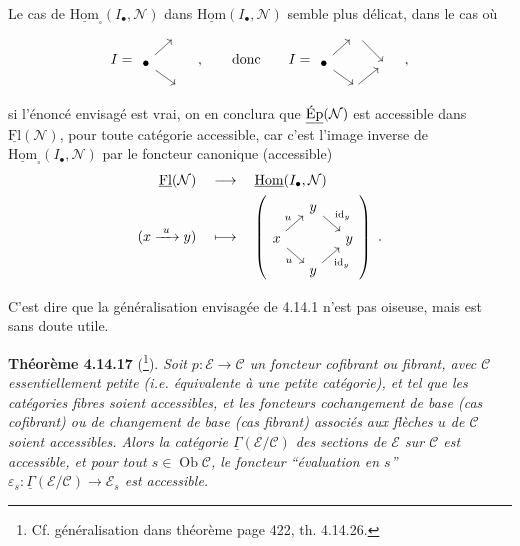 \documentclass[11pt]{article}
\newcommand{\printedpage}[1]{\marginpar{\footnotesize p.~#1}}
\newcommand{\msp}[1]{\marginpar{\footnotesize [#1]}}
\newcommand{\uHom}{\underline{\mathrm{Hom}}}
\newcommand{\uFl}{\underline{\mathrm{Fl}}}
\newcommand{\uEp}{\underline{\textup{Ép}}}
\newcommand{\uGamma}{\underline{\Gamma}}
\newcommand{\Ob}{\operatorname{Ob}}
\begin{document}
Le cas de $\uHom_{\square}(I_\bullet,\mathcal{N})$ dans $\uHom(I_\bullet,\mathcal{N})$ semble plus délicat, dans le cas où
\msp{page 390}
\[
I = 
\begin{tikzcd}[sep=small]
 & {} \\
\bullet \arrow[ur] \arrow[dr] & \\
 & {}
\end{tikzcd}
\quad , \qquad \text{donc} \qquad
I = 
\begin{tikzcd}[sep=small]
 & {} \arrow[dr] & \\
\bullet \arrow[ur] \arrow[dr] & & {} \\
 & {} \arrow[ur] &
\end{tikzcd}
\quad ,
\]
si l'énoncé envisagé est vrai, on en conclura que $\uEp(\mathcal{N})$ est accessible dans $\uFl(\mathcal{N})$, pour toute catégorie accessible, car c'est l'image inverse de $\uHom_{\square}(I_\bullet,\mathcal{N})$ par le foncteur canonique (accessible)
\[
\begin{aligned}
\uFl(\mathcal{N}) \quad &\longrightarrow \quad \uHom(I_\bullet,\mathcal{N}) \\
(x \xrightarrow{\ u\ } y) \quad &\longmapsto \quad
\left(
\begin{tikzcd}[sep=small, ampersand replacement=\&]
 \& y \arrow[dr, "\mathrm{id}_y"] \& \\
x \arrow[ur, "u"] \arrow[dr, "u"'] \& \& y \\
 \& y \arrow[ur, "\mathrm{id}_y"'] \&
\end{tikzcd}
\right) \ .
\end{aligned}
\]

\printedpage{148}

C'est dire que la généralisation envisagée de 4.14.1 n'est pas oiseuse, mais est sans doute utile.

\msp{page 391}
\textbf{Théorème 4.14.17} (\footnote[168]{Cf. généralisation dans théorème page 422, th. 4.14.26.}). \textit{Soit $p : \mathcal{E} \longrightarrow \mathcal{C}$ un foncteur cofibrant ou fibrant, avec $\mathcal{C}$ essentiellement petite (i.e. équivalente à une petite catégorie), et tel que les catégories fibres soient accessibles, et les foncteurs cochangement de base (cas cofibrant) ou de changement de base (cas fibrant) associés aux flèches $u$ de $\mathcal{C}$ soient accessibles. Alors la catégorie $\uGamma(\mathcal{E}/\mathcal{C})$ des sections de $\mathcal{E}$ sur $\mathcal{C}$ est accessible, et pour tout $s \in \Ob\mathcal{C}$, le foncteur ``évaluation en $s$'' $\varepsilon_s : \uGamma(\mathcal{E}/\mathcal{C}) \longrightarrow \mathcal{E}_s$ est accessible.}
\end{document}
